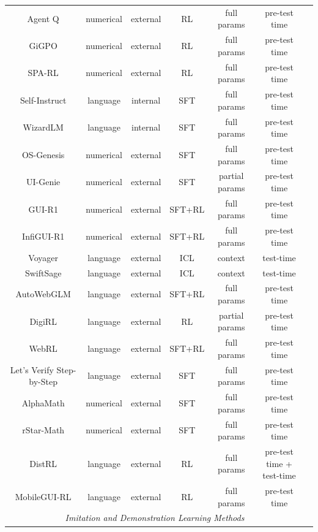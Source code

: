 \begin{table}[!t]
{\begin{tabular}{ccccccc}
Agent Q\citep{putta2024agentq} & numerical & external & RL & full params & pre-test time \\
GiGPO\citep{feng2025group} & numerical & external & RL & full params & pre-test time \\
SPA-RL\citep{wang2025spa} & numerical & external & RL & full params & pre-test time \\
Self-Instruct\citep{wang2022self} & language & internal & SFT & full params & pre-test time \\
WizardLM\citep{xu2024wizardlm} & language & internal & SFT & full params & pre-test time \\
OS-Genesis\citep{sun2024genesis} & numerical & external & SFT & full params & pre-test time \\
UI-Genie\citep{xiao2025ui} & numerical & external & SFT & partial params & pre-test time \\
GUI-R1\citep{luo2025gui} & numerical & external & SFT+RL & full params & pre-test time \\
InfiGUI-R1\citep{liu2025infigui} & numerical & external & SFT+RL & full params & pre-test time \\
Voyager\citep{wang2023voyager} & language & external & ICL & context & test-time \\
SwiftSage\citep{lin2023swiftsage} & language & external & ICL & context & test-time \\
AutoWebGLM\citep{lai2024autowebglm} & language & external & SFT+RL & full params & pre-test time \\
DigiRL\citep{bai2024digirl} & language & external & RL & partial params & pre-test time \\
WebRL\citep{qi2024webrl} & language & external & SFT+RL & full params & pre-test time \\
Let's Verify Step-by-Step\citep{lightman2023let} & language & external & SFT & full params & pre-test time \\
AlphaMath\citep{chen2024alphamath} & numerical & external & SFT & full params & pre-test time \\
rStar-Math\citep{guan2025rstar} & numerical & external & SFT & full params & pre-test time \\
DistRL\citep{wang2024distrl} & language & external & RL & full params & pre-test time + test-time \\
MobileGUI-RL\citep{shi2025mobileguirladvancingmobilegui} & language & external & RL & full params & pre-test time \\ \midrule
\multicolumn{6}{c}{\textit{Imitation and Demonstration Learning Methods}} \\\midrule

\end{tabular}}
\end{table}

